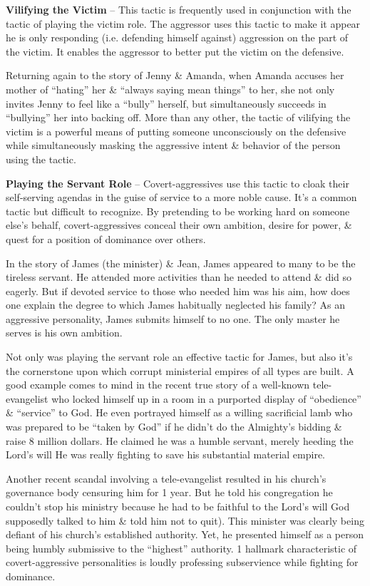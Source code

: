\documentclass{article}
\numberwithin{equation}{section}
\begin{document}
\textbf{Vilifying the Victim} -- This tactic is frequently used in conjunction with the tactic of playing the victim role. The aggressor uses this tactic to make it appear he is only responding (i.e. defending himself against) aggression on the part of the victim. It enables the aggressor to better put the victim on the defensive.

Returning again to the story of Jenny \& Amanda, when Amanda accuses her mother of ``hating'' her \& ``always saying mean things'' to her, she not only invites Jenny to feel like a ``bully'' herself, but simultaneously succeeds in ``bullying'' her into backing off. More than any other, the tactic of vilifying the victim is a powerful means of putting someone unconsciously on the defensive while simultaneously masking the aggressive intent \& behavior of the person using the tactic.

\textbf{Playing the Servant Role} -- Covert-aggressives use this tactic to cloak their self-serving agendas in the guise of service to a more noble cause. It's a common tactic but difficult to recognize. By pretending to be working hard on someone else's behalf, covert-aggressives conceal their own ambition, desire for power, \& quest for a position of dominance over others.

In the story of James (the minister) \& Jean, James appeared to many to be the tireless servant. He attended more activities than he needed to attend \& did so eagerly. But if devoted service to those who needed him was his aim, how does one explain the degree to which James habitually neglected his family? As an aggressive personality, James submits himself to no one. The only master he serves is his own ambition.

Not only was playing the servant role an effective tactic for James, but also it's the cornerstone upon which corrupt ministerial empires of all types are built. A good example comes to mind in the recent true story of a well-known tele-evangelist who locked himself up in a room in a purported display of ``obedience'' \& ``service'' to God. He even portrayed himself as a willing sacrificial lamb who was prepared to be ``taken by God'' if he didn't do the Almighty's bidding \& raise 8 million dollars. He claimed he was a humble servant, merely heeding the Lord's will He was really fighting to save his substantial material empire.

Another recent scandal involving a tele-evangelist resulted in his church's governance body censuring him for 1 year. But he told his congregation he couldn't stop his ministry because he had to be faithful to the Lord's will God supposedly talked to him \& told him not to quit). This minister was clearly being defiant of his church's established authority. Yet, he presented himself as a person being humbly submissive to the ``highest'' authority. 1 hallmark characteristic of covert-aggressive personalities is loudly professing subservience while fighting for dominance.
\end{document}
